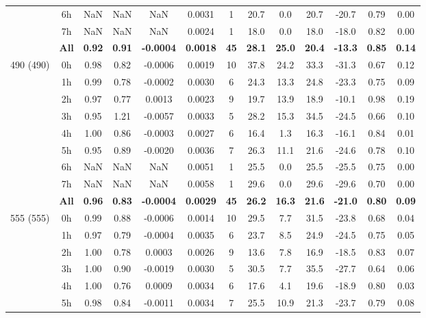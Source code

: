 \documentclass[preview]{standalone}
\begin{document}
\begin{tabular}{ccccccccccccc}
 & 6h & NaN & NaN & NaN & 0.0031 &  1 & 20.7 & 0.0 & 20.7 & -20.7 & 0.79 & 0.00 \\ 
 & 7h & NaN & NaN & NaN & 0.0024 &  1 & 18.0 & 0.0 & 18.0 & -18.0 & 0.82 & 0.00 \\ \cline{2-13}
 & \textbf{All} & \textbf{0.92} & \textbf{0.91} & \textbf{-0.0004} & \textbf{0.0018} & \textbf{45} & \textbf{28.1} & \textbf{25.0} & \textbf{20.4} & \textbf{-13.3} & \textbf{0.85} & \textbf{0.14} \\ \hline
\multirow{9}{*}{490 (490)} & 0h & 0.98 & 0.82 & -0.0006 & 0.0019 & 10 & 37.8 & 24.2 & 33.3 & -31.3 & 0.67 & 0.12 \\ 
 & 1h & 0.99 & 0.78 & -0.0002 & 0.0030 &  6 & 24.3 & 13.3 & 24.8 & -23.3 & 0.75 & 0.09 \\ 
 & 2h & 0.97 & 0.77 & 0.0013 & 0.0023 &  9 & 19.7 & 13.9 & 18.9 & -10.1 & 0.98 & 0.19 \\ 
 & 3h & 0.95 & 1.21 & -0.0057 & 0.0033 &  5 & 28.2 & 15.3 & 34.5 & -24.5 & 0.66 & 0.10 \\ 
 & 4h & 1.00 & 0.86 & -0.0003 & 0.0027 &  6 & 16.4 & 1.3 & 16.3 & -16.1 & 0.84 & 0.01 \\ 
 & 5h & 0.95 & 0.89 & -0.0020 & 0.0036 &  7 & 26.3 & 11.1 & 21.6 & -24.6 & 0.78 & 0.10 \\ 
 & 6h & NaN & NaN & NaN & 0.0051 &  1 & 25.5 & 0.0 & 25.5 & -25.5 & 0.75 & 0.00 \\ 
 & 7h & NaN & NaN & NaN & 0.0058 &  1 & 29.6 & 0.0 & 29.6 & -29.6 & 0.70 & 0.00 \\ \cline{2-13}
 & \textbf{All} & \textbf{0.96} & \textbf{0.83} & \textbf{-0.0004} & \textbf{0.0029} & \textbf{45} & \textbf{26.2} & \textbf{16.3} & \textbf{21.6} & \textbf{-21.0} & \textbf{0.80} & \textbf{0.09} \\ \hline
\multirow{9}{*}{555 (555)} & 0h & 0.99 & 0.88 & -0.0006 & 0.0014 & 10 & 29.5 & 7.7 & 31.5 & -23.8 & 0.68 & 0.04 \\ 
 & 1h & 0.97 & 0.79 & -0.0004 & 0.0035 &  6 & 23.7 & 8.5 & 24.9 & -24.5 & 0.75 & 0.05 \\ 
 & 2h & 1.00 & 0.78 & 0.0003 & 0.0026 &  9 & 13.6 & 7.8 & 16.9 & -18.5 & 0.83 & 0.07 \\ 
 & 3h & 1.00 & 0.90 & -0.0019 & 0.0030 &  5 & 30.5 & 7.7 & 35.5 & -27.7 & 0.64 & 0.06 \\ 
 & 4h & 1.00 & 0.76 & 0.0009 & 0.0034 &  6 & 17.6 & 4.1 & 19.6 & -18.9 & 0.80 & 0.03 \\ 
 & 5h & 0.98 & 0.84 & -0.0011 & 0.0034 &  7 & 25.5 & 10.9 & 21.3 & -23.7 & 0.79 & 0.08 \\ 

\end{tabular}
\end{document}
